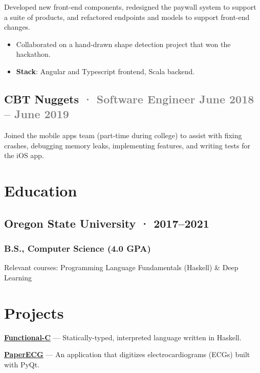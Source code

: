 \documentclass[12pt]{article} %
\providecommand{\tightlist}{%
  \setlength{\itemsep}{0pt}\setlength{\parskip}{0pt}}
\let\defaultref\href
\renewcommand{\href}[2]{%
  \defaultref{#1}{\ul{#2}}%
}
\renewcommand{\emph}[1]{%
  \textcolor{gray}{#1}%
}
\begin{document}
Developed new front-end components, redesigned the paywall system to
support a suite of products, and refactored endpoints and models to
support front-end changes.

\begin{itemize}
\tightlist
\item
  Collaborated on a hand-drawn shape detection project that won the
  hackathon.
\item
  \textbf{Stack}: Angular and Typescript frontend, Scala backend.
\end{itemize}

\hypertarget{cbt-nuggets-software-engineer-june-2018-june-2019}{%
\subsection{\texorpdfstring{CBT Nuggets \emph{· \small Software Engineer
\hfill June 2018 -- June
2019}}{CBT Nuggets · Software Engineer June 2018 -- June 2019}}\label{cbt-nuggets-software-engineer-june-2018-june-2019}}

Joined the mobile apps team (part-time during college) to assist with
fixing crashes, debugging memory leaks, implementing features, and
writing tests for the iOS app.

\begin{paracol}{2}
\setlength{\columnsep}{1em}

\hypertarget{education}{%
\section{Education}\label{education}}

\hypertarget{oregon-state-university-20172021}{%
\subsection{Oregon State University ·
2017--2021}\label{oregon-state-university-20172021}}

\vspace{-5pt}

\hypertarget{b.s.-computer-science-4.0-gpa}{%
\subsubsection{B.S., Computer Science (4.0
GPA)}\label{b.s.-computer-science-4.0-gpa}}

Relevant courses: Programming Language Fundamentals (Haskell) \& Deep
Learning

\switchcolumn

\hypertarget{projects}{%
\section{Projects}\label{projects}}

\textbf{\href{https://github.com/julianfortune/CS381Project}{Functional-C}}
--- Statically-typed, interpreted language written in Haskell.

\textbf{\href{https://github.com/Tereshchenkolab/paper-ecg}{PaperECG}}
--- An application that digitizes electrocardiograms (ECGs) built with
PyQt.

\end{paracol}
\end{document}
